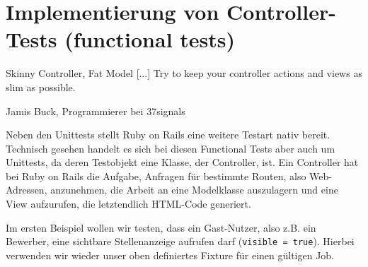 \section{Implementierung von Controller-Tests (functional tests)}
\epigraph{Skinny Controller, Fat Model [...] Try to keep your controller actions and views as slim as possible.}{Jamis Buck, Programmierer bei 37signals}


Neben den Unittests stellt Ruby on Rails eine weitere Testart nativ bereit. Technisch gesehen handelt es sich bei diesen Functional Tests aber auch um Unittests, da deren Testobjekt eine Klasse, der Controller, ist.
Ein Controller hat bei Ruby on Rails die Aufgabe, Anfragen für bestimmte Routen, also Web-Adressen, anzunehmen, die Arbeit an eine Modelklasse auszulagern und eine View aufzurufen, die letztendlich HTML-Code generiert.

Im ersten Beispiel wollen wir testen, dass ein Gast-Nutzer, also z.B. ein Bewerber, eine sichtbare Stellenanzeige aufrufen darf (\texttt{visible = true}). Hierbei verwenden wir wieder unser oben definiertes Fixture für einen gültigen Job.
%
%
%
%
\begin{ruby}[label=test/functional/jobs\_controller\_test.rb]
 

   
    
    \PY{o}{[}\PY{o}{]}  
      

        

     
      
\end{ruby}

